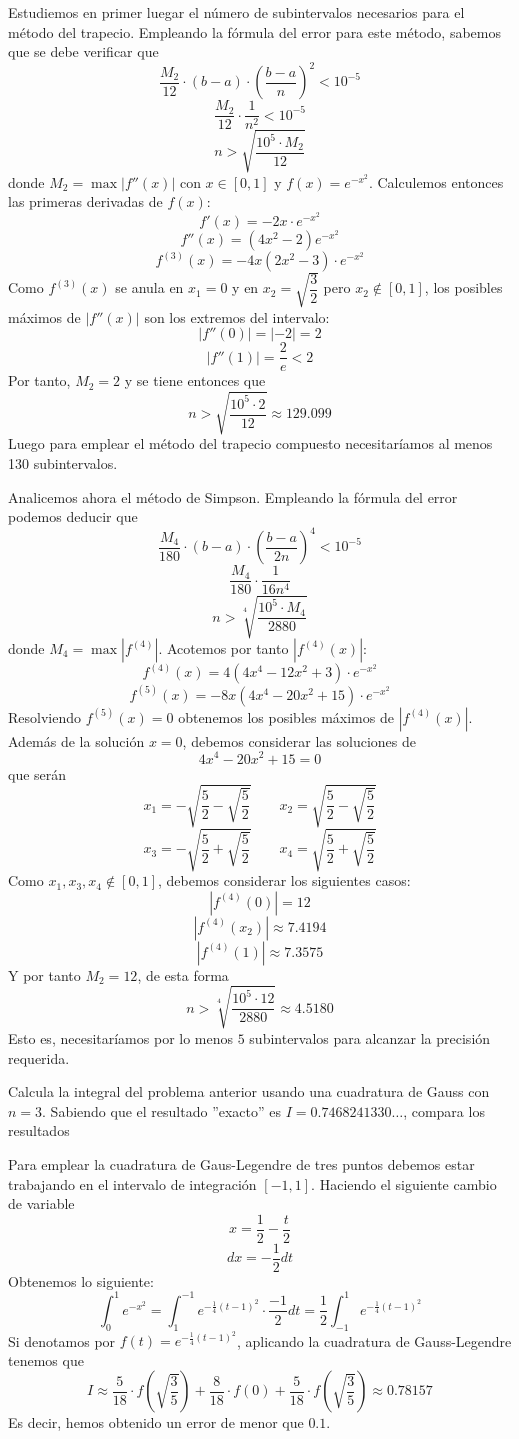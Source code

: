 \begin{sol}
Estudiemos en primer luegar el número de subintervalos necesarios para el método del trapecio. Empleando la fórmula del error para este método, sabemos que se debe verificar que
$$\dfrac{M_2}{12}\cdot(b-a)\cdot\left(\dfrac{b-a}{n}\right)^2<10^{-5}$$
$$\dfrac{M_2}{12}\cdot\dfrac{1}{n^2}<10^{-5}$$
$$n>\sqrt{\dfrac{10^{5}\cdot M_2}{12}}$$
donde $M_2=\max|f''(x)|$ con $x\in[0,1]$ y $f(x)=e^{-x^2}$. Calculemos entonces las primeras derivadas de $f(x)$:
$$f'(x)=-2x\cdot e^{-x^2}$$
$$f''(x)=(4x^2-2)e^{-x^2}$$
$$f^{(3)}(x)=-4x(2x^2-3)\cdot e^{-x^2}$$
Como $f^{(3)}(x)$ se anula en $x_1=0$ y en $x_2=\sqrt{\dfrac{3}{2}}$ pero $x_2\nin [0,1]$, los posibles máximos de $|f''(x)|$ son los extremos del intervalo:
$$|f''(0)|=|-2|=2$$
$$|f''(1)|=\dfrac{2}{e}<2$$
Por tanto, $M_2=2$ y se tiene entonces que
$$n>\sqrt{\dfrac{10^{5}\cdot 2}{12}}\approx 129.099$$
Luego para emplear el método del trapecio compuesto necesitaríamos al menos 130 subintervalos.

Analicemos ahora el método de Simpson. Empleando la fórmula del error podemos deducir que
$$\dfrac{M_4}{180}\cdot (b-a)\cdot \left(\dfrac{b-a}{2n}\right)^4<10^{-5}$$
$$\dfrac{M_4}{180}\cdot\dfrac{1}{16n^4}$$
$$n>\sqrt[4]{\dfrac{10^5\cdot M_4}{2880}}$$
donde $M_4=\max|f^{(4)}|$. Acotemos por tanto $|f^{(4)}(x)|$:
$$f^{(4)}(x)=4(4x^4-12x^2+3)\cdot e^{-x^2}$$
$$f^{(5)}(x)=-8x(4x^{4}-20x^2+15)\cdot e^{-x^2}$$
Resolviendo $f^{(5)}(x)=0$ obtenemos los posibles máximos de $|f^{(4)}(x)|$. Además de la solución $x=0$, debemos considerar las soluciones de 
$$4x^4-20x^2+15=0$$
que serán
$$x_1=-\sqrt{\dfrac{5}{2}-\sqrt{\dfrac{5}{2}}} \qquad x_2=\sqrt{\dfrac{5}{2}-\sqrt{\dfrac{5}{2}}} $$
$$x_3=-\sqrt{\dfrac{5}{2}+\sqrt{\dfrac{5}{2}}} \qquad x_4=\sqrt{\dfrac{5}{2}+\sqrt{\dfrac{5}{2}}} $$
Como $x_1,x_3,x_4\nin [0,1]$, debemos considerar los siguientes casos:
$$|f^{(4)}(0)|=12$$
$$|f^{(4)}(x_2)|\approx 7.4194$$
$$|f^{(4)}(1)|\approx 7.3575$$
Y por tanto $M_2=12$, de esta forma
$$n>\sqrt[4]{\dfrac{10^5\cdot 12}{2880}}\approx 4.5180$$
Esto es, necesitaríamos por lo menos $5$ subintervalos para alcanzar la precisión requerida.
\end{sol}
\begin{ejer}
Calcula la integral del problema anterior usando una cuadratura de Gauss con $n=3$. Sabiendo que el resultado ''exacto'' es $I=0.7468241330\ldots$, compara los resultados
\end{ejer}
\begin{sol}
Para emplear la cuadratura de Gaus-Legendre de tres puntos debemos estar trabajando en el intervalo de integración $[-1,1]$. Haciendo el siguiente cambio de variable
$$x=\dfrac{1}{2}-\dfrac{t}{2}$$
$$dx=-\dfrac{1}{2}dt$$
Obtenemos lo siguiente:
$$\int_0^1e^{-x^2}=\int_1^{-1}e^{-\frac{1}{4}(t-1)^2}\cdot \dfrac{-1}{2}dt=\dfrac{1}{2}\int_{-1}^1e^{-\frac{1}{4}(t-1)^2}$$
Si denotamos por $f(t)=e^{-\frac{1}{4}(t-1)^2}$, aplicando la cuadratura de Gauss-Legendre tenemos que
$$I\approx \dfrac{5}{18}\cdot f\left(\sqrt{\dfrac{3}{5}}\right)+ \dfrac{8}{18}\cdot f(0)+\dfrac{5}{18}\cdot f\left(\sqrt{\dfrac{3}{5}}\right)\approx 0.78157$$
Es decir, hemos obtenido un error de menor que $0.1$.
\end{sol}
